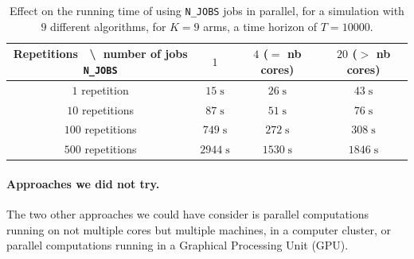 \begin{table}[ht]
    \centering
    \begin{tabular}{c|ccc}
    \textbf{Repetitions} $\;$ \textbackslash $\;$ number of jobs \texttt{N\_JOBS} & $1$ & $4$ ($=$ nb cores) & $20$ ($>$ nb cores) \\
        \hline
        $1$ repetition    & $15 \;\text{s}$ & $26 \;\text{s}$ & $43 \;\text{s}$ \\
        $10$ repetitions  & $87 \;\text{s}$ & $51 \;\text{s}$ & $76 \;\text{s}$ \\
        $100$ repetitions & $749 \;\text{s}$ & $272 \;\text{s}$ & $308 \;\text{s}$ \\
        $500$ repetitions & $2944 \;\text{s}$ & $1530 \;\text{s}$ & $1846 \;\text{s}$ \\
        \hline
    \end{tabular}
    \caption{Effect on the running time of using \texttt{N\_JOBS} jobs in parallel, for a simulation with $9$ different algorithms, for $K=9$ arms, a time horizon of $T=10000$.}
    \label{table:3:speedUpTimeParallelComputations}
\end{table}



\paragraph{Approaches we did not try.}
%
The two other approaches we could have consider is parallel computations running on not multiple cores but multiple machines, in a computer cluster, or parallel computations running in a Graphical Processing Unit (GPU).

